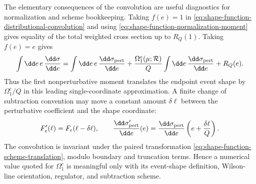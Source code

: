 The elementary consequences of the convolution are useful diagnostics for
normalization and scheme bookkeeping.  Taking \(f(e)=1\) in
\eqref{eq:shape-function-distributional-convolution} and using
\eqref{eq:shape-function-normalization-moment} gives equality of the total
weighted cross section up to \(R_Q(1)\).  Taking \(f(e)=e\) gives
\begin{equation}
  \int\dd e\,e\,\frac{\dd\sigma}{\dd e}
  =
  \int\dd e\,e\,\frac{\dd\sigma_{\rm pert}}{\dd e}
  +
  \frac{\Omega_1^e(\mu;\mathcal R)}{Q}
  \int\dd e\,\frac{\dd\sigma_{\rm pert}}{\dd e}
  +R_Q(e).
  \label{eq:shape-function-first-moment-shift}
\end{equation}
Thus the first nonperturbative moment translates the endpoint event shape by
\(\Omega_1^e/Q\) in this leading single-coordinate approximation.  A finite
change of subtraction convention may move a constant amount \(\delta\ell\)
between the perturbative coefficient and the shape coordinate:
\begin{equation}
  F'_e(\ell)=F_e(\ell-\delta\ell),
  \qquad
  \frac{\dd\sigma'_{\rm pert}}{\dd e}(e)
  =
  \frac{\dd\sigma_{\rm pert}}{\dd e}
  \left(e+\frac{\delta\ell}{Q}\right).
  \label{eq:shape-function-scheme-translation}
\end{equation}
The convolution is invariant under the paired transformation
\eqref{eq:shape-function-scheme-translation}, modulo boundary and truncation
terms.  Hence a numerical value quoted for \(\Omega_1^e\) is meaningful only
with its event-shape definition, Wilson-line orientation, regulator, and
subtraction scheme.

